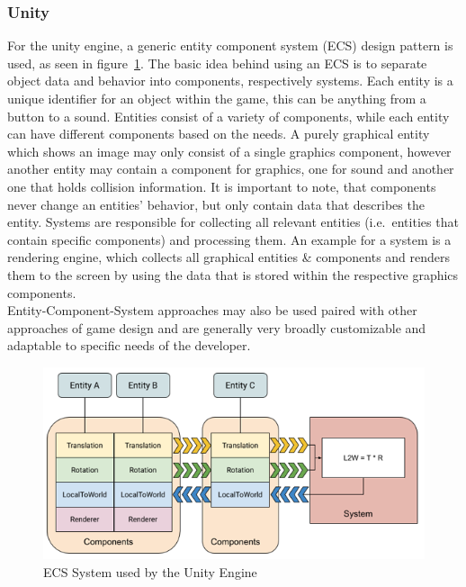 \subsubsection{Unity}\label{subsubsec:entity-component-system}
For the unity engine, a generic entity component system (ECS) design pattern is used, as seen in figure~\ref{fig:ecs-unity}.
The basic idea behind using an ECS is to separate object data and behavior into components, respectively systems.
Each entity is a unique identifier for an object within the game, this can be anything from a button to a sound.
Entities consist of a variety of components, while each entity can have different components based on the needs.
A purely graphical entity which shows an image may only consist of a single graphics component, however another entity may contain
a component for graphics, one for sound and another one that holds collision information.
It is important to note, that components never change an entities' behavior, but only contain data that describes the entity.
Systems are responsible for collecting all relevant entities (i.e.\ entities that contain specific components) and processing them.
An example for a system is a rendering engine, which collects all graphical entities \& components and renders them to the screen by
using the data that is stored within the respective graphics components.
\\
Entity-Component-System approaches may also be used paired with other approaches of game design and are generally very broadly customizable and adaptable
to specific needs of the developer.
\begin{figure}
    \centering
    \includegraphics[width=\textwidth]{Pictures/res/fundamentals/ECSBlockDiagram-unity}
    \caption{ECS System used by the Unity Engine }
    \label{fig:ecs-unity}
\end{figure}
